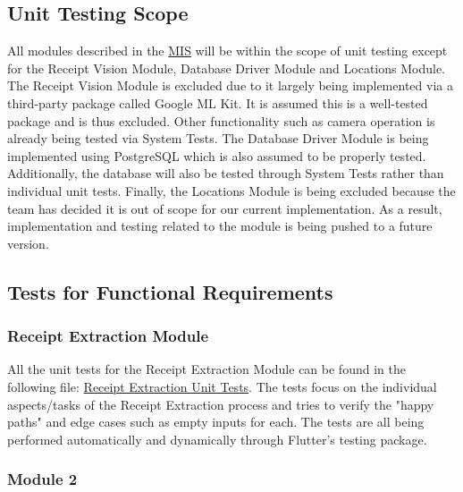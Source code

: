 \documentclass[12pt, titlepage]{article}
\begin{document}
\subsection{Unit Testing Scope}

  All modules described in the \href{https://github.com/r-yeh/grocery-spending-tracker/blob/master/docs/Design/SoftDetailedDes/MIS.pdf}{MIS}
  will be within the scope of unit testing except for the Receipt Vision Module, Database
  Driver Module and Locations Module. The Receipt Vision Module is excluded due to it largely being implemented via a third-party
  package called Google ML Kit. It is assumed this is a well-tested package and is thus excluded. Other functionality
  such as camera operation is already being tested via System Tests. The Database Driver Module is being implemented
  using PostgreSQL which is also assumed to be properly tested. Additionally, the database will also be tested through
  System Tests rather than individual unit tests. Finally, the Locations Module is being excluded because the team
  has decided it is out of scope for our current implementation. As a result, implementation and testing related to
  the module is being pushed to a future version.

\subsection{Tests for Functional Requirements}


  \subsubsection{Receipt Extraction Module}

  All the unit tests for the Receipt Extraction Module can be found in the following file: 
  \href{https://github.com/allanfang1/grocery_spending_tracker_app/blob/main/test/receipt_extraction_test.dart}{Receipt Extraction
  Unit Tests}. The tests focus on the individual aspects/tasks of the Receipt Extraction process and tries to verify
  the "happy paths" and edge cases such as empty inputs for each. The tests are all being performed automatically
  and dynamically through Flutter's testing package.

\subsubsection{Module 2}
\end{document}
